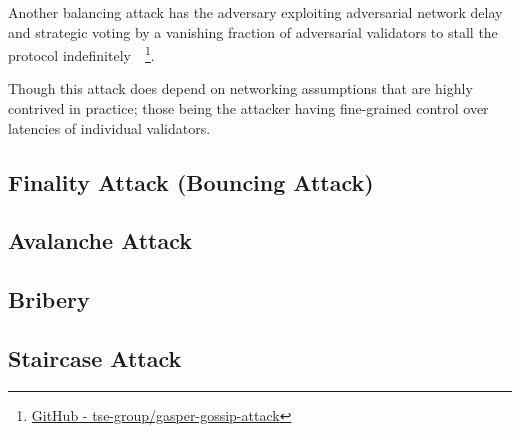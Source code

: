 Another balancing attack has the adversary
exploiting adversarial network delay
and strategic voting by a vanishing fraction of adversarial validators
to stall the protocol indefinitely~\cite{10.1007/978-3-031-18283-9_28}~\footnote{
\href{https://github.com/tse-group/gasper-gossip-attack}{GitHub - tse-group/gasper-gossip-attack}}.

Though this attack does depend on networking assumptions that are highly contrived in practice; those being the attacker having fine-grained control over latencies of individual validators.

\subsection{Finality Attack (Bouncing Attack)}\label{subsec:finality-attack-(bouncing-attack)}

\subsection{Avalanche Attack}\label{subsec:avalanche-attack}

\subsection{Bribery}\label{subsec:bribery}

\subsection{Staircase Attack}\label{subsec:staircase-attack}